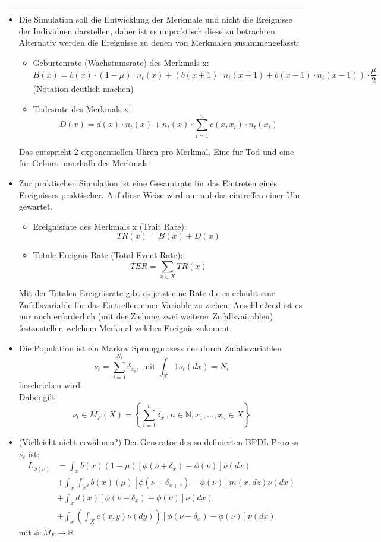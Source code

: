 \documentclass[11pt, a4paper, german]{article}
\begin{document}
	
	
	
	\noindent\rule{\textwidth}{1pt}
	\begin{itemize}
		\item 
		Die Simulation soll die Entwicklung der Merkmale und nicht die Ereignisse der Individuen darstellen, daher ist es unpraktisch diese zu betrachten. Alternativ werden die Ereignisse zu denen von Merkmalen zusammengefasst:
		\begin{itemize}
			\item Geburtenrate (Wachstumsrate) des Merkmals x: \[ B(x) = b(x) \cdot (1 - \mu) \cdot n_t(x) + (b(x+1)\cdot n_t(x+1) + b(x-1)\cdot n_t(x-1)) \cdot \frac{\mu}{2} \]
			(Notation deutlich machen)
			\item Todesrate des Merkmals x: 
			\[ D(x) = d(x) \cdot n_t(x) + n_t(x) \cdot \sum_{i=1}^{n} c(x,x_i) \cdot n_t(x_i) \]
		\end{itemize}
		Das entspricht 2 exponentiellen Uhren pro Merkmal. Eine für Tod und eine für Geburt innerhalb des Merkmals.
		\item Zur praktischen Simulation ist eine Gesamtrate für das Eintreten eines Ereignisses praktischer. Auf diese Weise wird nur auf das eintreffen einer Uhr gewartet.
		\begin{itemize}
			\item Ereignisrate des Merkmals x (Trait Rate):
				\[ TR(x) = B(x) + D(x) \]
			\item Totale Ereignis Rate (Total Event Rate): 
			\[ TER = \sum_{x \in X} TR(x)\]
		\end{itemize}
		Mit der Totalen Ereignisrate gibt es jetzt eine Rate die es erlaubt eine Zufallsvariable für das Eintreffen einer Variable zu ziehen. Anschließend ist es nur noch erforderlich (mit der Ziehung zwei weiterer Zufallsvairablen) festzustellen welchem Merkmal welches Ereignis zukommt.
		\item Die Population ist ein Markov Sprungprozess der durch Zufallsvariablen
		\[ \nu_t = \sum_{i=1}^{N_t} \delta_{x_i}, \text{ mit } \int_X 1\nu_t(dx) = N_t \]
		beschrieben wird.\\
		Dabei gilt: \[ \nu_t \in M_F(X) = \left\{ \sum_{i=1}^{n} \delta_{x_i}, n \in \mathbb{N}, x_1, \dots, x_n \in X \right\} \]
		\item (Vielleicht nicht erwähnen?) Der Generator des so definierten BPDL-Prozess $ \nu_t $ ist:
		\begin{align}
			L_{\phi(\nu)} &= \int_{x} b(x)(1-\mu)[\phi(\nu + \delta_x) - \phi(\nu)]\nu(dx)\\
						&+ \int_{x}\int_{\mathbb{R}^d} b(x)(\mu)[\phi(\nu + \delta_{x+z}) - \phi(\nu)] m(x,dz) \nu(dx)\\
						&+ \int_{x} d(x)[\phi(\nu - \delta_x) - \phi(\nu)]\nu(dx)\\
						&+ \int_{x} \left( \int_{X} c(x,y) \nu(dy) \right) [\phi(\nu - \delta_x) - \phi(\nu)]\nu(dx)
		\end{align}
		mit $ \phi: M_F \to \mathbb{R} $
	\end{itemize}
	
\end{document}
